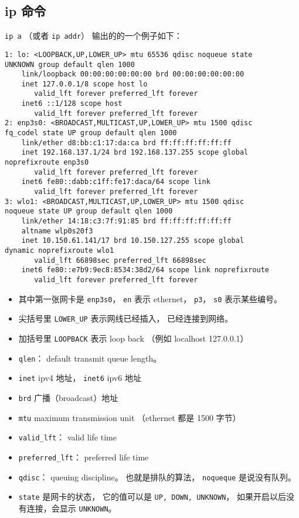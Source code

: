 \subsection{ip 命令}
\verb|ip a| （或者 \verb|ip addr|） 输出的的一个例子如下：
\begin{lstlisting}[language=none]
1: lo: <LOOPBACK,UP,LOWER_UP> mtu 65536 qdisc noqueue state 
UNKNOWN group default qlen 1000
    link/loopback 00:00:00:00:00:00 brd 00:00:00:00:00:00
    inet 127.0.0.1/8 scope host lo
       valid_lft forever preferred_lft forever
    inet6 ::1/128 scope host 
       valid_lft forever preferred_lft forever
2: enp3s0: <BROADCAST,MULTICAST,UP,LOWER_UP> mtu 1500 qdisc
fq_codel state UP group default qlen 1000
    link/ether d8:bb:c1:17:da:ca brd ff:ff:ff:ff:ff:ff
    inet 192.168.137.1/24 brd 192.168.137.255 scope global 
noprefixroute enp3s0
       valid_lft forever preferred_lft forever
    inet6 fe80::dabb:c1ff:fe17:daca/64 scope link 
       valid_lft forever preferred_lft forever
3: wlo1: <BROADCAST,MULTICAST,UP,LOWER_UP> mtu 1500 qdisc
noqueue state UP group default qlen 1000
    link/ether 14:18:c3:7f:91:85 brd ff:ff:ff:ff:ff:ff
    altname wlp0s20f3
    inet 10.150.61.141/17 brd 10.150.127.255 scope global 
dynamic noprefixroute wlo1
       valid_lft 66898sec preferred_lft 66898sec
    inet6 fe80::e7b9:9ec8:8534:38d2/64 scope link noprefixroute 
       valid_lft forever preferred_lft forever
\end{lstlisting}
\begin{itemize}
\item 其中第一张网卡是 \verb|enp3s0|， \verb|en| 表示 ethernet， \verb|p3|， \verb|s0| 表示某些编号。
\item 尖括号里 \verb|LOWER_UP| 表示网线已经插入， 已经连接到网络。
\item 加括号里 \verb|LOOPBACK| 表示 loop back （例如 localhost 127.0.0.1）
\item \verb|qlen|： default transmit queue length。
\item \verb|inet| ipv4 地址， \verb|inet6| ipv6 地址
\item \verb|brd| 广播（broadcast）地址
\item \verb|mtu| maximum transmission unit （ethernet 都是 1500 字节）
\item \verb|valid_lft|： valid life time
\item \verb|preferred_lft|： preferred life time
\item \verb|qdisc|： queuing discipline。 也就是排队的算法， \verb|noqueque| 是说没有队列。
\item \verb|state| 是网卡的状态， 它的值可以是 \verb|UP, DOWN, UNKNOWN|， 如果开启以后没有连接，会显示 \verb|UNKNOWN|。
\end{itemize}


